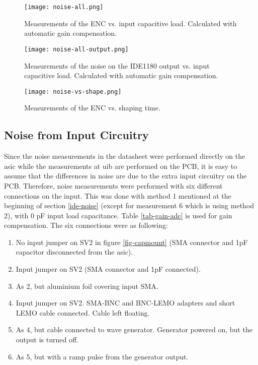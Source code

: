 \documentclass[../main/thesis.tex]{subfiles}
\begin{document}
\begin{figure}[p] %
	\centering
	\texttt{[image: noise-all.png]}
	\caption{Measurements of the \gls{ENC} vs. input capacitive load. Calculated with automatic gain compensation.}
	\label{fig-noise-all}
\end{figure} 

\begin{figure}[p] %
	\centering
	\texttt{[image: noise-all-output.png]}
	\caption{Measurements of the noise on the IDE1180 output vs. input capacitive load. Calculated with automatic gain compensation.}
	\label{fig-noise-all-output}
\end{figure} 

\begin{figure}[h] %
	\centering
	\texttt{[image: noise-vs-shape.png]}
	\caption{Measurements of the \gls{ENC} vs. shaping time.}
	\label{fig-noise-shape}
\end{figure} 

\newpage
\subsection{Noise from Input Circuitry}
\label{ide-noise-input}

Since the noise measurements in the datasheet were performed directly on the \gls{asic} while the measurements at \gls{uib} are performed on the \gls{PCB}, it is easy to assume that the differences in noise are due to the extra input circuitry on the \gls{PCB}. Therefore, noise measurements were performed with six different connections on the input. This was done with method 1 mentioned at the beginning of section \ref{ide-noise} (except for measurement 6 which is using method 2), with 0 pF input load capacitance. Table \ref{tab-gain-adc} is used for gain compensation. The six connections were as following:
\begin{enumerate}  
	\item No input jumper on SV2 in figure \ref{fig-capmount} (SMA connector and 1pF capacitor disconnected from the \gls{asic}).
	\item Input jumper on SV2 (SMA connector and 1pF connected).
	\item As 2, but aluminium foil covering input SMA.
	\item Input jumper on SV2. SMA-BNC and BNC-LEMO adapters and short LEMO cable connected. Cable left floating.
	\item As 4, but cable connected to wave generator. Generator powered on, but the output is turned off.
	\item As 5, but with a ramp pulse from the generator output.   
\end{enumerate}
\end{document}
